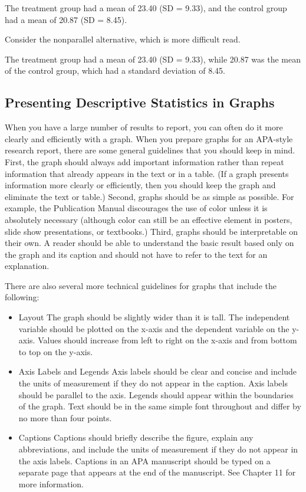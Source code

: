 \begin{kframe}
The treatment group had a mean of 23.40 (SD = 9.33), and the control group had a mean of 20.87 (SD = 8.45).
\end{kframe}

Consider the nonparallel alternative, which is more difficult read.

\begin{kframe}
The treatment group had a mean of 23.40 (SD = 9.33), while 20.87 was the mean of the control group, which had a standard deviation of 8.45.
\end{kframe}

\subsection{Presenting Descriptive Statistics in Graphs}

When you have a large number of results to report, you can often do it more clearly and efficiently with a graph. When you prepare graphs for an APA-style research report, there are some general guidelines that you should keep in mind. First, the graph should always add important information rather than repeat information that already appears in the text or in a table. (If a graph presents information more clearly or efficiently, then you should keep the graph and eliminate the text or table.) Second, graphs should be as simple as possible. For example, the Publication Manual discourages the use of color unless it is absolutely necessary (although color can still be an effective element in posters, slide show presentations, or textbooks.) Third, graphs should be interpretable on their own. A reader should be able to understand the basic result based only on the graph and its caption and should not have to refer to the text for an explanation.


There are also several more technical guidelines for graphs that include the following:

\begin{itemize}
\item Layout
The graph should be slightly wider than it is tall.
The independent variable should be plotted on the x-axis and the dependent variable on
the y-axis.
Values should increase from left to right on the x-axis and from bottom to top on the y-axis.

\item Axis Labels and Legends
Axis labels should be clear and concise and include the units of measurement if they do not appear in the caption.
Axis labels should be parallel to the axis.
Legends should appear within the boundaries of the graph.
Text should be in the same simple font throughout and differ by no more than four points.

\item Captions
Captions should briefly describe the figure, explain any abbreviations, and include the units of measurement if they do not appear in the axis labels.
Captions in an APA manuscript should be typed on a separate page that appears at the end of the manuscript. See Chapter 11 for more information.
\end{itemize}


